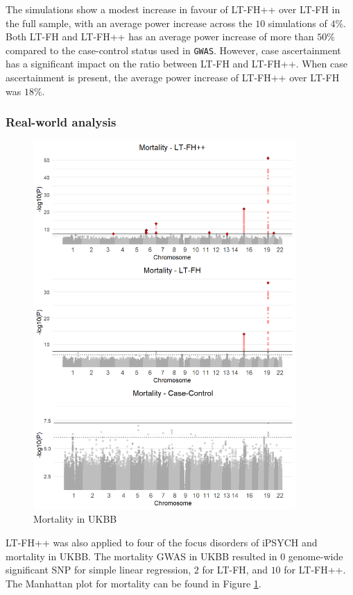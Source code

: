 The simulations show a modest increase in favour of LT-FH++ over LT-FH in the full sample, with an average power increase across the $ 10 $ simulations of $ 4\% $. Both LT-FH and LT-FH++ has an average power increase of more than $ 50\% $ compared to the case-control status used in \texttt{GWAS}. However, case ascertainment has a significant impact on the ratio between LT-FH and LT-FH++. When case ascertainment is present, the average power increase of LT-FH++ over LT-FH was $ 18\% $.

\subsubsection{Real-world analysis}
\begin{figure}
	\label{fig:LTFH++_manhattanMortality}
	\caption{Mortality in UKBB}
	\includegraphics[width=10cm]{results/manhattanPlot_mortality.png}
\end{figure}
LT-FH++ was also applied to four of the focus disorders of iPSYCH and mortality in UKBB. The mortality GWAS in UKBB resulted in $ 0 $ genome-wide significant SNP for simple linear regression, $ 2 $ for LT-FH, and $ 10 $ for LT-FH++. The Manhattan plot for mortality can be found in Figure \ref{fig:LTFH++_manhattanMortality}.
